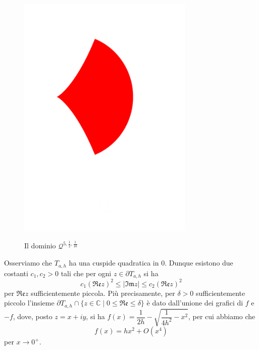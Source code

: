 \begin{figure}[h!]
    \begin{center}
        \includegraphics[width=0.75\textwidth, trim=0 10cm 0 5cm]{Immagini/qalphaah.pdf} \\
        \caption{Il dominio $\mathcal{Q}^{5,\frac{1}{2},\frac{1}{10}}$}
    \end{center}
\end{figure}

Osserviamo che $T_{a,h}$ ha una cuspide quadratica in $0$. Dunque esistono due costanti $c_1,c_2>0$ tali che per ogni $z\in\partial T_{a,h}$ si ha
\begin{equation} \label{cusp_estimate}
    c_1(\mathfrak{Re}z)^2 \le |\mathfrak{Im}z| \le c_2(\mathfrak{Re}z)^2
\end{equation}
per $\mathfrak{Re}z$ sufficientemente piccola. Più precisamente, per $\delta>0$ sufficientemente piccolo l'insieme $\partial T_{a,h}\cap\{z\in\mathbb{C}\mid 0 \le \mathfrak{Re}\le\delta\}$ è dato dall'unione dei grafici di $f$ e $-f$, dove, posto $z=x+iy$, si ha $f(x)=\dfrac{1}{2h}-\sqrt{\dfrac{1}{4h^2}-x^2}$, per cui abbiamo che
\begin{equation} \label{cerchio}
    f(x)=hx^2+O(x^4)
\end{equation}
per $x\longrightarrow0^+$.

